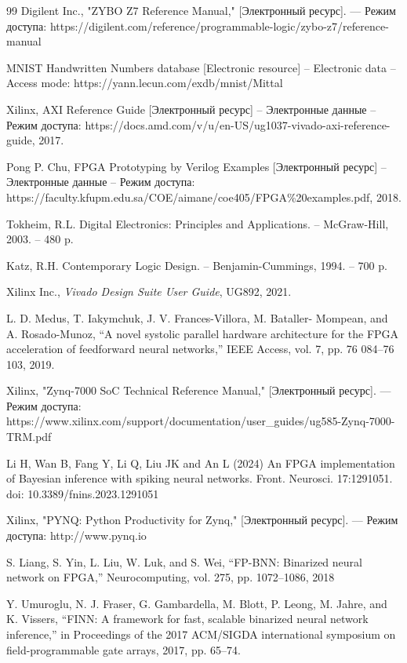 \begin{thebibliography}{99}
     Digilent Inc., "ZYBO Z7 Reference Manual," [Электронный ресурс]. — Режим доступа: https://digilent.com/reference/programmable-logic/zybo-z7/reference-manual
    
     MNIST Handwritten Numbers database [Electronic resource] – Electronic data – Access mode: https://yann.lecun.com/exdb/mnist/Mittal

     Xilinx, {AXI Reference Guide} [Электронный ресурс] – Электронные данные – Режим доступа: https://docs.amd.com/v/u/en-US/ug1037-vivado-axi-reference-guide, 2017.

     Pong P. Chu, {FPGA Prototyping by Verilog Examples} [Электронный ресурс] – Электронные данные – Режим доступа: https://faculty.kfupm.edu.sa/COE/aimane/coe405/FPGA\%20examples.pdf, 2018.

     Tokheim, R.L. Digital Electronics: Principles and Applications. – McGraw-Hill, 2003. – 480 p.

     Katz, R.H. Contemporary Logic Design. – Benjamin-Cummings, 1994. – 700 p.

     Xilinx Inc., \textit{Vivado Design Suite User Guide}, UG892, 2021.  

      L. D. Medus, T. Iakymchuk, J. V. Frances-Villora, M. Bataller-
Mompean, and A. Rosado-Munoz, “A novel systolic parallel hardware
architecture for the FPGA acceleration of feedforward neural networks,”
IEEE Access, vol. 7, pp. 76 084–76 103, 2019.

     Xilinx, "Zynq-7000 SoC Technical Reference Manual," [Электронный ресурс]. — Режим доступа: https://www.xilinx.com/support/documentation/user\_guides/ug585-Zynq-7000-TRM.pdf

     Li H, Wan B, Fang Y, Li Q, Liu JK and An L (2024) An FPGA implementation of Bayesian inference with spiking neural networks. Front. Neurosci. 17:1291051. doi: 10.3389/fnins.2023.1291051
    
     Xilinx, "PYNQ: Python Productivity for Zynq," [Электронный ресурс]. — Режим доступа: http://www.pynq.io

     S. Liang, S. Yin, L. Liu, W. Luk, and S. Wei, “FP-BNN: Binarized
    neural network on FPGA,” Neurocomputing, vol. 275, pp. 1072–1086,
    2018
    
     Y. Umuroglu, N. J. Fraser, G. Gambardella, M. Blott, P. Leong, M. Jahre,
    and K. Vissers, “FINN: A framework for fast, scalable binarized
    neural network inference,” in Proceedings of the 2017 ACM/SIGDA
    international symposium on field-programmable gate arrays, 2017, pp.
    65–74.
    

\end{thebibliography}

